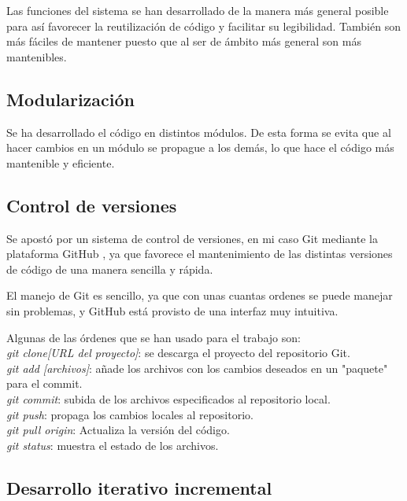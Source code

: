 Las funciones del sistema se han desarrollado de la manera más general posible para así favorecer la reutilización de código y facilitar su legibilidad. También son más fáciles de mantener puesto que al ser de ámbito más general son más mantenibles.

\bigskip
\subsection{Modularización}
\bigskip

Se ha desarrollado el código en distintos módulos. De esta forma se evita que al hacer cambios en un módulo se propague a los demás, lo que hace el código más mantenible y eficiente.

\bigskip
\subsection{Control de versiones}
\bigskip

Se apostó por un sistema de control de versiones, en mi caso Git mediante la plataforma GitHub \cite{github}, ya que favorece el mantenimiento de las distintas versiones de código de una manera sencilla y rápida.

El manejo de Git es sencillo, ya que con unas cuantas ordenes se puede manejar sin problemas, y GitHub está provisto de una interfaz muy intuitiva. 

\bigskip
Algunas de las órdenes que se han usado para el trabajo son:\\


\textit{git clone[URL del proyecto]}: se descarga el proyecto del repositorio Git.\\


\textit{git add [archivos]}: añade los archivos con los cambios deseados en un "paquete" para el commit.\\


\textit{git commit}: subida de los archivos especificados al repositorio local.\\


\textit{git push}: propaga los cambios locales al repositorio.\\


\textit{git pull origin}: Actualiza la versión del código.\\


\textit{git status}: muestra el estado de los archivos.\\


\bigskip
\subsection{Desarrollo iterativo incremental}
\bigskip

